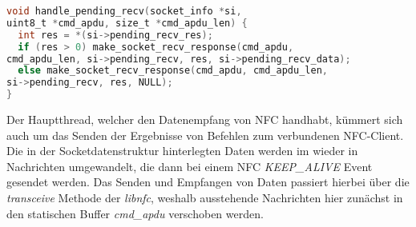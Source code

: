 	    \begin{lstlisting}[frame=bt, label={lst:nfc:recvPending}, language=C, caption=Senden von Daten über NFC (Servercode in C) \cite{nfcSockets}]
void handle_pending_recv(socket_info *si,
uint8_t *cmd_apdu, size_t *cmd_apdu_len) {
  int res = *(si->pending_recv_res);
  if (res > 0) make_socket_recv_response(cmd_apdu,
cmd_apdu_len, si->pending_recv, res, si->pending_recv_data);
  else make_socket_recv_response(cmd_apdu, cmd_apdu_len,
si->pending_recv, res, NULL);
}
        \end{lstlisting}
	    Der Hauptthread, welcher den Datenempfang von NFC handhabt, kümmert sich auch um das Senden der Ergebnisse von Befehlen zum verbundenen NFC-Client. Die in der Socketdatenstruktur hinterlegten Daten werden im  wieder in Nachrichten umgewandelt, die dann bei einem NFC {\it KEEP\_ALIVE} Event gesendet werden. Das Senden und Empfangen von Daten passiert hierbei über die {\it transceive} Methode der {\it libnfc}, weshalb ausstehende Nachrichten hier zunächst in den statischen Buffer {\it cmd\_apdu} verschoben werden.
	    
